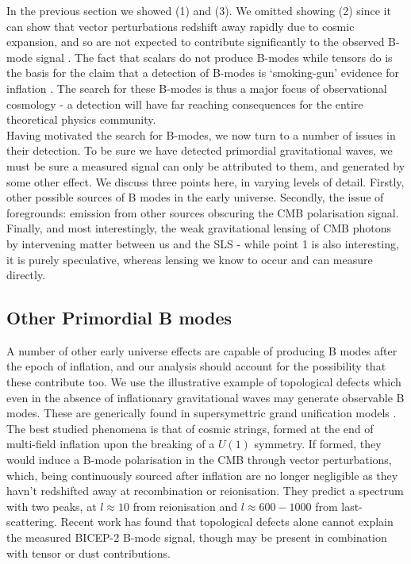 \documentclass[a4paper,10pt]{article}
\begin{document}
In the previous section we showed (1) and (3). We omitted showing (2) since it can show that vector perturbations redshift away rapidly due to cosmic expansion, and so are not expected to contribute significantly to the observed B-mode signal  \cite{vector}. The fact that scalars do not produce B-modes while tensors do is the basis for the claim that a detection of B-modes is `smoking-gun'  evidence for inflation \cite{smokinggun}. The search for these B-modes is thus a major focus of observational cosmology - a detection will have far reaching consequences for the entire theoretical physics community. \\

Having motivated the search for B-modes, we now turn to a number of issues in their detection. To be sure we have detected primordial gravitational waves, we must be sure a measured signal can only be attributed to them, and generated by some other effect. We discuss three points here, in varying levels of detail. Firstly, other possible sources of B modes in the early universe. Secondly, the issue of foregrounds: emission from other sources obscuring the CMB polarisation signal. Finally, and most interestingly, the weak gravitational lensing of CMB photons by intervening matter between us and the SLS - while point 1 is also interesting, it is purely speculative, whereas lensing we know to occur and can measure directly.


\subsection{Other Primordial B modes}

A number of other early universe effects are capable of producing B modes after the epoch of inflation, and our analysis should account for the possibility that these contribute too. We use the illustrative example of topological defects which even in the absence of inflationary gravitational waves may generate observable B modes. These are generically found in supersymettric grand unification models \cite{CMBPol}.\\

The best studied phenomena is that of cosmic strings, formed at the end of multi-field inflation upon the breaking of a $U(1)$ symmetry. If formed, they would induce a B-mode polarisation in the CMB through vector perturbations, which, being continuously sourced after inflation are no longer negligible as they havn't redshifted away at recombination or reionisation. They predict a spectrum with two peaks, at $l\approx10$ from reionisation and $l\approx 600-1000$ from last-scattering. Recent work has found that topological defects alone cannot explain the measured BICEP-2 B-mode signal, though may be present in combination with tensor or dust contributions.\\
\end{document}
